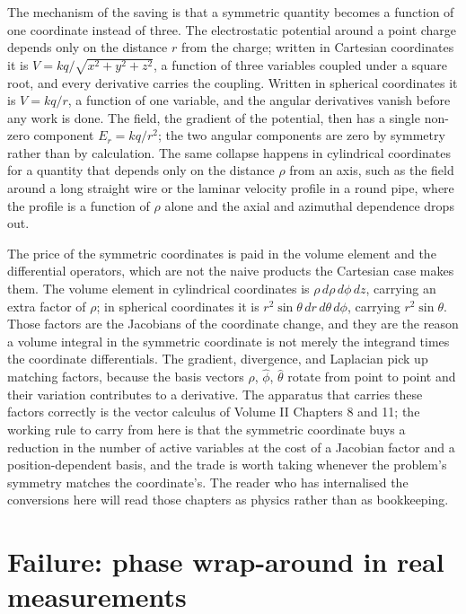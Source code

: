 The mechanism of the saving is that a symmetric quantity becomes a
function of one coordinate instead of three. The electrostatic
potential around a point charge depends only on the distance $r$ from
the charge; written in Cartesian coordinates it is $V = kq/\sqrt{x^{2}
+ y^{2} + z^{2}}$, a function of three variables coupled under a square
root, and every derivative carries the coupling. Written in spherical
coordinates it is $V = kq/r$, a function of one variable, and the
angular derivatives vanish before any work is done. The field, the
gradient of the potential, then has a single non-zero component
$E_r = kq/r^{2}$; the two angular components are zero by symmetry
rather than by calculation. The same collapse happens in cylindrical
coordinates for a quantity that depends only on the distance $\rho$
from an axis, such as the field around a long straight wire or the
laminar velocity profile in a round pipe, where the profile is a
function of $\rho$ alone and the axial and azimuthal dependence drops
out.

The price of the symmetric coordinates is paid in the volume element
and the differential operators, which are not the naive products the
Cartesian case makes them. The volume element in cylindrical
coordinates is $\rho\,d\rho\,d\phi\,dz$, carrying an extra factor of
$\rho$; in spherical coordinates it is $r^{2}\sin\theta\,dr\,d\theta\,
d\phi$, carrying $r^{2}\sin\theta$. Those factors are the Jacobians of
the coordinate change, and they are the reason a volume integral in the
symmetric coordinate is not merely the integrand times the coordinate
differentials. The gradient, divergence, and Laplacian pick up
matching factors, because the basis vectors $\hat\rho$, $\hat\phi$,
$\hat\theta$ rotate from point to point and their variation contributes
to a derivative. The apparatus that carries these factors correctly is
the vector calculus of Volume II Chapters 8 and 11; the working rule to
carry from here is that the symmetric coordinate buys a reduction in
the number of active variables at the cost of a Jacobian factor and a
position-dependent basis, and the trade is worth taking whenever the
problem's symmetry matches the coordinate's. The reader who has
internalised the conversions here will read those chapters as physics
rather than as bookkeeping.

\section{Failure: phase wrap-around in real measurements}

